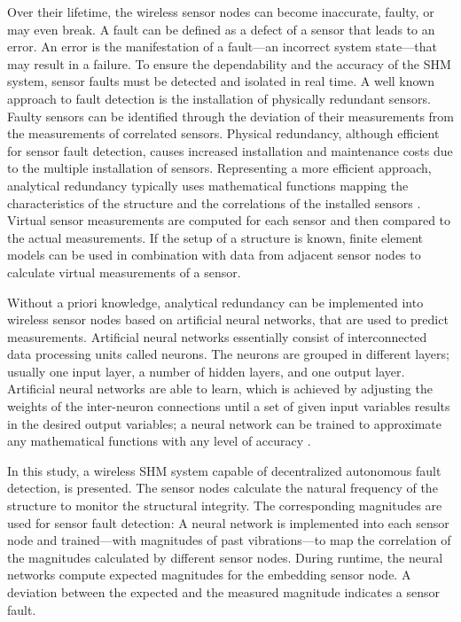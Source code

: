 \documentclass[12pt,a4paper]{scrartcl}
\begin{document}
Over their lifetime, the wireless sensor nodes can become inaccurate, faulty, or may even break.
A fault can be defined as a defect of a sensor that leads to an error. An error is the manifestation of a fault---an incorrect system state---that may result in a failure.
To ensure the dependability and the accuracy of the SHM system, sensor faults must be detected and isolated in real time. 
A well known approach to fault detection is the installation of physically redundant sensors.
Faulty sensors can be identified through the deviation of their measurements from the measurements of correlated sensors.
Physical redundancy, although efficient for sensor fault detection, causes increased installation and maintenance costs due to the multiple installation of sensors. 
Representing a more efficient approach, analytical redundancy typically uses mathematical functions mapping the characteristics of the structure and the correlations of the installed sensors \citep{Smarsly2014}. 
Virtual sensor measurements are computed for each sensor and then compared to the actual measurements. 
If the setup of a structure is known, finite element models can be used in combination with data from adjacent sensor nodes to calculate virtual measurements of a sensor.

Without a priori knowledge, analytical redundancy can be implemented into wireless sensor nodes based on artificial neural networks, that are used to predict measurements.
Artificial neural networks essentially consist of interconnected data processing units called neurons. 
The neurons are grouped in different layers; usually one input layer, a number of hidden layers, and one output layer.
Artificial neural networks are able to learn, which is achieved by adjusting the weights of the inter-neuron connections until a set of given input variables results in the desired output variables; a neural network can be trained to approximate any mathematical functions with any level of accuracy \citep{Li2011}.

In this study, a wireless SHM system capable of decentralized autonomous fault detection, is presented.
The sensor nodes calculate the natural frequency of the structure to monitor the structural integrity.
The corresponding magnitudes are used for sensor fault detection:
A neural network is implemented into each sensor node and trained---with magnitudes of past vibrations---to map the correlation of the magnitudes calculated by different sensor nodes.
During runtime, the neural networks compute expected magnitudes for the embedding sensor node.
A deviation between the expected and the measured magnitude indicates a sensor fault.
\end{document}
